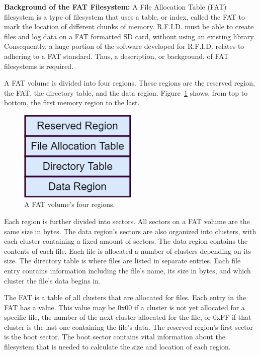 \label{ssss:FAT_background}
\textbf{Background of the FAT Filesystem:} A File Allocation Table (FAT) filesystem is a type of filesystem that uses a table, or index, called the FAT to mark the location of different chunks of memory. R.F.I.D. must be able to create files and log data on a FAT formatted SD card, without using an existing library. Consequently, a huge portion of the software developed for R.F.I.D. relates to adhering to a FAT standard. Thus, a description, or background, of FAT filesystems is required.

 
A FAT volume is divided into four regions. These regions are the reserved region, the FAT, the directory table, and the data region. Figure~\ref{fig:FAT_regions} shows, from top to bottom, the first memory region to the last.

\begin{figure}[H]
    \centering
    \includegraphics[width=0.5\textwidth]{Figures/4_details/fat_regions.png} 
    \caption{A FAT volume's four regions.}
    \label{fig:FAT_regions}
\end{figure}

Each region is further divided into sectors. All sectors on a FAT volume are the same size in bytes. The data region's sectors are also organized into clusters, with each cluster containing a fixed amount of sectors. The data region contains the contents of each file. Each file is allocated a number of clusters depending on its size. The directory table is where files are listed in separate entries. Each file entry contains information including the file's name, its size in bytes, and which cluster the file's data begins in. 

The FAT is a table of all clusters that are allocated for files. Each entry in the FAT has a value. This value may be 0x00 if a cluster is not yet allocated for a specific file, the number of the next cluster allocated for the file, or 0xFF if that cluster is the last one containing the file's data. The reserved region's first sector is the boot sector. The boot sector contains vital information about the filesystem that is needed to calculate the size and location of each region.

